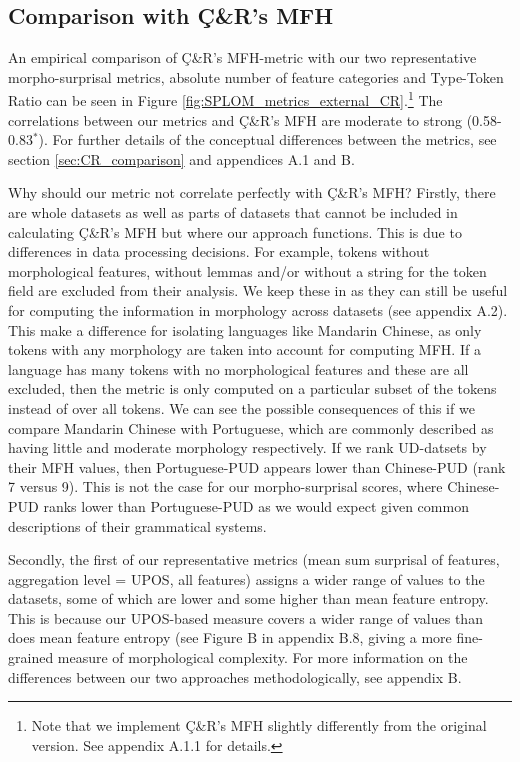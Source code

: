 \documentclass[USenglish]{article}
\begin{document}
\FloatBarrier
\subsection{Comparison with Ç\&R's MFH}
\label{supplementary_section_comparison_MFH}
An empirical comparison of Ç\&R's MFH-metric with our two representative morpho-surprisal metrics, absolute number of feature categories and Type-Token Ratio can be seen in Figure \ref{fig:SPLOM_metrics_external_CR}.\footnote{Note that we implement Ç\&R's MFH slightly differently from the original version. See appendix A.1.1
for details.}
The correlations between our metrics and Ç\&R's MFH are moderate to strong (0.58-0.83$^*$).
For further details of the conceptual differences between the metrics, see section \ref{sec:CR_comparison} and appendices A.1 %
and B.

Why should our metric not correlate perfectly with Ç\&R's MFH?
Firstly, there are whole datasets as well as parts of datasets that cannot be included in calculating Ç\&R's MFH but where our approach functions.
This is due to differences in data processing decisions.
For example, tokens without morphological features, without lemmas and/or without a string for the token field are excluded from their analysis.
We keep these in as they can still be useful for computing the information in morphology across datasets (see appendix A.2).
This make a difference for isolating languages like Mandarin Chinese, as only tokens with any morphology are taken into account for computing MFH.
If a language has many tokens with no morphological features and these are all excluded, then the metric is only computed on a particular subset of the tokens instead of over all tokens. 
We can see the possible consequences of this if we compare Mandarin Chinese with Portuguese, which are commonly described as having little and moderate morphology respectively.
If we rank UD-datsets by their MFH values, then Portuguese-PUD appears lower than Chinese-PUD (rank 7 versus 9). 
This is not the case for our morpho-surprisal scores, where Chinese-PUD ranks lower than Portuguese-PUD as we would expect given common descriptions of their grammatical systems.

Secondly, the first of our representative metrics (mean sum surprisal of features, aggregation level = UPOS, all features) assigns a wider range of values to the datasets, some of which are lower and some higher than mean feature entropy.
This is because our UPOS-based measure covers a wider range of values than does mean feature entropy (see Figure B
in appendix B.8,
giving a more fine-grained measure of morphological complexity.
For more information on the differences between our two approaches methodologically, see appendix B.
\end{document}
